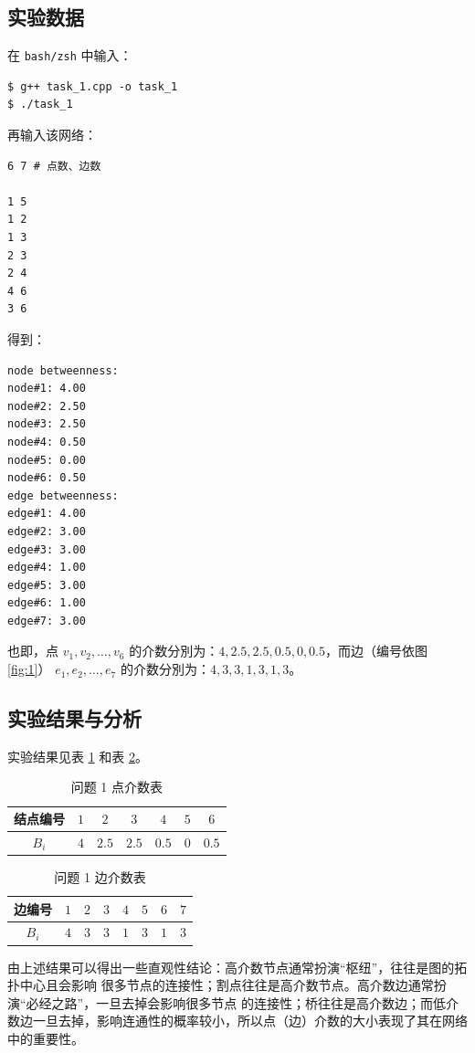 \documentclass{article}
\begin{document}
\subsection{实验数据}

在 \lstinline{bash/zsh} 中输入：
\begin{lstlisting}
$ g++ task_1.cpp -o task_1
$ ./task_1
\end{lstlisting}
再输入该网络：
\begin{lstlisting}
6 7 # 点数、边数

1 5
1 2
1 3
2 3
2 4
4 6
3 6
\end{lstlisting}
得到：
\begin{lstlisting}
node betweenness:
node#1: 4.00
node#2: 2.50
node#3: 2.50
node#4: 0.50
node#5: 0.00
node#6: 0.50
edge betweenness:
edge#1: 4.00
edge#2: 3.00
edge#3: 3.00
edge#4: 1.00
edge#5: 3.00
edge#6: 1.00
edge#7: 3.00
\end{lstlisting}
也即，点 $v_1,v_2,\ldots,v_6$ 的介数分別为：$4,2.5,2.5,0.5,0,0.5$，而边（编号依图 \ref{fig:1}） $e_1,e_2,\ldots,e_7$ 的介数分別为：$4,3,3,1,3,1,3$。

\subsection{实验结果与分析}

实验结果见表 \ref{tab:1} 和表 \ref{tab:2}。

\begin{table}[ht]
    \centering
    \label{tab:1}
    \begin{tabular}{|c|c|c|c|c|c|c|}
        \hline
        结点编号&$1$&$2$&$3$&$4$&$5$&$6$\\
        \hline
        $B_{i}$&$4$&$2.5$&$2.5$&$0.5$&$0$&$0.5$\\
        \hline
    \end{tabular}
    \caption{问题 1 点介数表}
\end{table}


\begin{table}[ht]
    \centering
    \label{tab:2}
    \begin{tabular}{|c|c|c|c|c|c|c|c|}
        \hline
        边编号&$1$&$2$&$3$&$4$&$5$&$6$&$7$\\
        \hline
        $B_{i}$&$4$&$3$&$3$&$1$&$3$&$1$&$3$\\
        \hline
    \end{tabular}
    \caption{问题 1 边介数表}
\end{table}

由上述结果可以得出一些直观性结论：高介数节点通常扮演“枢纽”，往往是图的拓扑中心且会影响 很多节点的连接性；割点往往是高介数节点。高介数边通常扮演“必经之路”，一旦去掉会影响很多节点 的连接性；桥往往是高介数边；而低介数边一旦去掉，影响连通性的概率较小，所以点（边）介数的大小表现了其在网络中的重要性。
\end{document}
